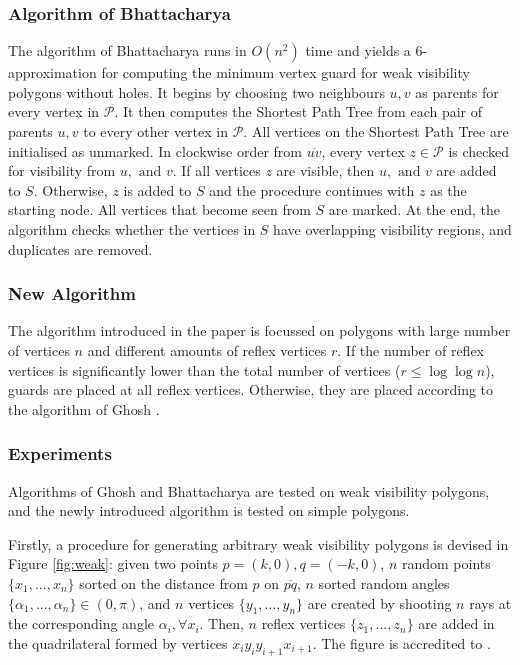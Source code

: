 \subsubsection{Algorithm of Bhattacharya \cite{bhattacharya2016approximability}}
The algorithm of Bhattacharya \cite{bhattacharya2016approximability} runs in $O(n^2)$ time and yields a 6-approximation for computing the minimum vertex guard for weak visibility polygons without holes. It begins by choosing two neighbours $u, v$ as parents for every vertex in $\mathcal P$. It then computes the Shortest Path Tree from each pair of parents $u, v$ to every other vertex in $\mathcal P$. All vertices on the Shortest Path Tree are initialised as unmarked. In clockwise order from $\overline{uv}$, every vertex $z \in \mathcal P$ is checked for visibility from $u, \text{ and } v$. If all vertices $z$ are visible, then $u, \text{ and }v$ are added to $S$. Otherwise, $z$ is added to $S$ and the procedure continues with $z$ as the starting node. All vertices that become seen from $S$ are marked. At the end, the algorithm checks whether the vertices in $S$ have overlapping visibility regions, and duplicates are removed.

\subsubsection{New Algorithm}
The algorithm introduced in the paper is focussed on polygons with large number of vertices $n$ and different amounts of reflex vertices $r$. If the number of reflex vertices is significantly lower than the total number of vertices ($r \leq \log \log n$), guards are placed at all reflex vertices. Otherwise, they are placed according to the algorithm of Ghosh \cite{GHOSH2010718}.

\subsubsection{Experiments}
Algorithms of Ghosh \cite{GHOSH2010718} and Bhattacharya \cite{bhattacharya2016approximability} are tested on weak visibility polygons, and the newly introduced algorithm is tested on simple polygons. 

Firstly, a procedure for generating arbitrary weak visibility polygons is devised in Figure \ref{fig:weak}: given two points $p = (k, 0), q = (-k, 0)$,  $n$ random points $\{x_1, ..., x_n\}$ sorted on the distance from $p$ on $\overline{pq}$, $n$ sorted random angles $\{\alpha_1, ..., \alpha_n\} \in  (0, \pi)$, and $n$ vertices $\{y_1, ..., y_n\}$ are created by shooting $n$ rays at the corresponding angle $\alpha_i, \forall x_i$. Then, $n$ reflex vertices $\{z_1, ..., z_n\}$ are added in the quadrilateral formed by vertices $x_iy_iy_{i + 1}x_{i + 1}$. The figure is accredited to \cite{maleki2022implementation}.


